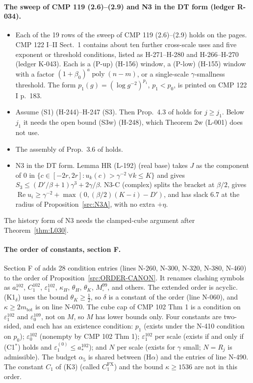 \paragraph{The sweep of CMP 119 (2.6)--(2.9) and N3 in the DT form (ledger R-034).}
\begin{proposition}[Row R-034]\label{src:B10-SWEEP}
\begin{itemize}
\item[(i)] Each of the 19 rows of the sweep of CMP 119 (2.6)--(2.9) holds on the pages. CMP 122 I--II Sect.~1 contains about ten further cross-scale uses and five exponent or threshold conditions, listed as H-271--H-280 and H-266--H-270 (ledger K-043). Each is a (P-up) (H-156) window, a (P-low) (H-155) window with a factor $(1+\beta_0)^a\operatorname{poly}(n-m)$, or a single-scale $\gamma$-smallness threshold. The form $p_1(g)=(\log g^{-2})^{p_1}$, $p_1<p_0$, is printed on CMP 122 I p.~183.
\item[(ii)] Assume (S1) (H-244)--H-247 (S3). Then Prop.\ 4.3 of  holds for $j\ge j_1$. Below $j_1$ it needs the open bound (S3w) (H-248), which Theorem 2w (L-001) does not use.
\item[(iii)] The assembly of Prop.\ 3.6 of  holds.
\item[(iv)] N3 in the DT form. Lemma HR (L-192) (real base) takes $J$ as the component of 0 in $\{c\in[-2r,2r]:u_k(c)>\gamma^{-2}\ \forall k\le K\}$ and gives $S_3\le(D'/\beta+1)\gamma^3+2\gamma/\beta$. N3-C (complex) splits the bracket at $\beta/2$, gives $\operatorname{Re}u_i\ge\gamma^{-2}+\max(0,(\beta/2)(K-i)-D')$, and has slack $6.7$ at the radius of Proposition~\ref{src:N3A}, with no extra $+\eta$.
\end{itemize}
\end{proposition}
The history form of N3 needs the clamped-cube argument after Theorem~\ref{thm:L030}.

\paragraph{The order of constants, section F.} Section F of  adds 28 condition entries (lines N-260, N-300, N-320, N-380, N-460) to the order of Proposition~\ref{src:ORDER-CANON}. It renames clashing symbols as $a_*^{102}$, $C_1^{102}$, $\varepsilon_1^{102}$, $\kappa_H$, $\theta_H$, $\theta_K$, $M_\square^{99}$, and others. The extended order is acyclic. (K1$_\delta$) uses the bound $\theta_K\ge\tfrac12$, so $\delta$ is a constant of the order (line N-060), and $\kappa\ge2m_{\mathrm{tot}}$ is on line N-070. The cube cap of CMP 102 Thm 1 is a condition on $\varepsilon_1^{102}$ and $\varepsilon_0^{109}$, not on $M$, so $M$ has lower bounds only. Four constants are two-sided, and each has an existence condition: $p_1$ (exists under the N-410 condition on $p_0$); $\varepsilon_0^{102}$ (nonempty by CMP 102 Thm 1); $\varepsilon_1^{102}$ per scale (exists if and only if (C1$^*$) holds and $\varepsilon_1^{(0)}\le a_*^{102}$); and $N$ per scale (exists for $\gamma$ small; $N=R_j$ is admissible). The budget $\alpha_5$ is shared between (H$\alpha$) and the entries of line N-490. The constant $C_1$ of (K3) (called $C_1^{\mathrm{FX}}$) and the bound $\kappa\ge1536$ are not in this order.

